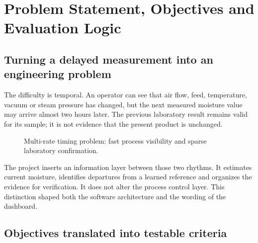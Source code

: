 \chapter{Problem Statement, Objectives and Evaluation Logic}
\label{chap:problem}

\section{Turning a delayed measurement into an engineering problem}

The difficulty is temporal. An operator can see that air flow, feed, temperature, vacuum or steam pressure has changed, but the next measured moisture value may arrive almost two hours later. The previous laboratory result remains valid for its sample; it is not evidence that the present product is unchanged.

\begin{figure}[ht]
\centering
{}
\caption{Multi-rate timing problem: fast process visibility and sparse laboratory confirmation.}
\label{fig:timing}
\end{figure}

The project inserts an information layer between those two rhythms. It estimates current moisture, identifies departures from a learned reference and organizes the evidence for verification. It does not alter the process control layer. This distinction shaped both the software architecture and the wording of the dashboard.

\section{Objectives translated into testable criteria}

